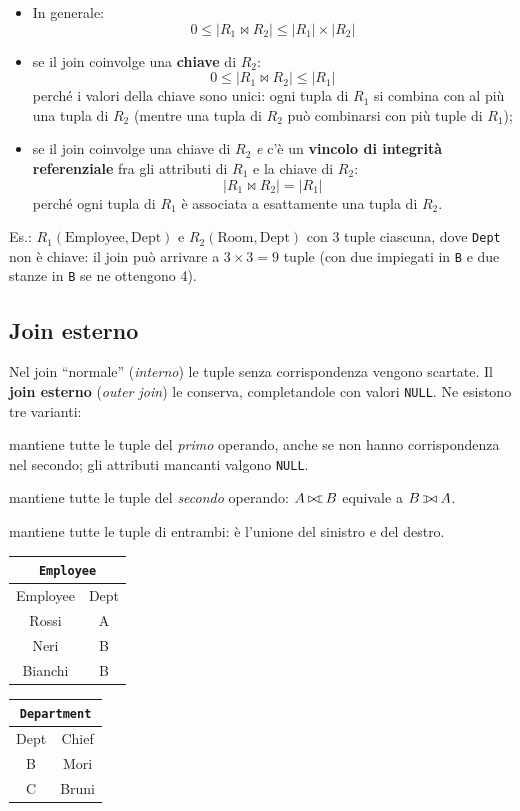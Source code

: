 \documentclass[a4paper,12pt]{article}
\newcommand{\ojoin}{\setbox0=\hbox{$\bowtie$}%
  \rule[-.02ex]{.25em}{.4pt}\llap{\rule[\ht0]{.25em}{.4pt}}}
\newcommand{\leftouterjoin}{\mathbin{\ojoin\mkern-5.8mu\bowtie}}
\newcommand{\rightouterjoin}{\mathbin{\bowtie\mkern-5.8mu\ojoin}}
\newcommand{\fullouterjoin}{\mathbin{\ojoin\mkern-5.8mu\bowtie\mkern-5.8mu\ojoin}}
\begin{document}
\begin{itemize}
  \item In generale:
    \[ 0 \leq |R_1 \bowtie R_2| \leq |R_1| \times |R_2| \]
  \item se il join coinvolge una \textbf{chiave} di $R_2$:
    \[ 0 \leq |R_1 \bowtie R_2| \leq |R_1| \]
    perché i valori della chiave sono unici: ogni tupla di $R_1$ si combina con
    al più una tupla di $R_2$ (mentre una tupla di $R_2$ può combinarsi con più
    tuple di $R_1$);
  \item se il join coinvolge una chiave di $R_2$ \emph{e} c'è un
    \textbf{vincolo di integrità referenziale} fra gli attributi di $R_1$ e la
    chiave di $R_2$:
    \[ |R_1 \bowtie R_2| = |R_1| \]
    perché ogni tupla di $R_1$ è associata a esattamente una tupla di $R_2$.
\end{itemize}

Es.: $R_1(\text{Employee}, \text{Dept})$ e $R_2(\text{Room}, \text{Dept})$ con
3 tuple ciascuna, dove \texttt{Dept} non è chiave: il join può arrivare a
$3 \times 3 = 9$ tuple (con due impiegati in \texttt{B} e due stanze in
\texttt{B} se ne ottengono 4).

\subsection{Join esterno}

Nel join ``normale'' (\emph{interno}) le tuple senza corrispondenza vengono
scartate. Il \textbf{join esterno} (\emph{outer join}) le conserva,
completandole con valori \texttt{NULL}. Ne esistono tre varianti:

\begin{description}[style=nextline]
  \item[Sinistro ($\leftouterjoin$)] mantiene tutte le tuple del \emph{primo}
    operando, anche se non hanno corrispondenza nel secondo; gli attributi
    mancanti valgono \texttt{NULL}.
  \item[Destro ($\rightouterjoin$)] mantiene tutte le tuple del \emph{secondo}
    operando: $A \rightouterjoin B$ equivale a $B \leftouterjoin A$.
  \item[Completo ($\fullouterjoin$)] mantiene tutte le tuple di entrambi:
    è l'unione del sinistro e del destro.
\end{description}

\begin{center}
\begin{tabular}{cc}
\multicolumn{2}{c}{\texttt{Employee}}\\ \hline
Employee & Dept\\ \hline
Rossi & A\\ Neri & B\\ Bianchi & B\\ \hline
\end{tabular}
\qquad
\begin{tabular}{cc}
\multicolumn{2}{c}{\texttt{Department}}\\ \hline
Dept & Chief\\ \hline
B & Mori\\ C & Bruni\\ \hline
\end{tabular}
\end{center}
\end{document}
